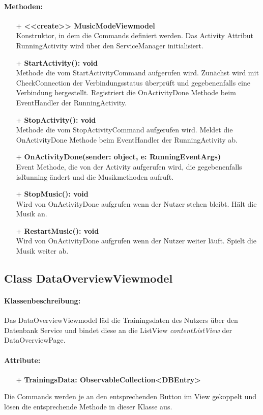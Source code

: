 \documentclass[a4paper,12pt]{article}
\begin{document}
\paragraph{Methoden:}
\begin{itemize}
	\item[+] \textbf{<<create>> MusicModeViewmodel} \\ Konstruktor, in dem die Commands definiert werden. Das Activity Attribut RunningActivity wird über den ServiceManager initialisiert.
	\item[+] \textbf{StartActivity(): void} \\ Methode die vom StartActivityCommand aufgerufen wird. Zunächst wird mit CheckConnection der Verbindungsstatus überprüft und gegebenenfalls eine Verbindung hergestellt. Registriert die OnActivityDone Methode beim EventHandler der RunningActivity. 
	\item[+] \textbf{StopActivity(): void} \\ Methode die vom StopActivityCommand aufgerufen wird. Meldet die OnActivityDone Methode beim EventHandler der RunningActivity ab. 
	\item[+] \textbf{OnActivityDone(sender: object, e: RunningEventArgs)} \\ Event Methode, die von der Activity aufgerufen wird, die gegebenenfalls isRunning ändert und die Musikmethoden aufruft.
	\item[+] \textbf{StopMusic(): void} \\ Wird von OnActivityDone aufgrufen wenn der Nutzer stehen bleibt. Hält die Musik an.
	\item[+] \textbf{RestartMusic(): void} \\ Wird von OnActivityDone aufgrufen wenn der Nutzer weiter läuft. Spielt die Musik weiter ab.
\end{itemize}

\subsection{Class DataOverviewViewmodel}
\paragraph{Klassenbeschreibung:}
Das DataOverviewViewmodel läd die Trainingsdaten des Nutzers über den Datenbank Service und bindet diese an die ListView \textit{contentListView} der DataOverviewPage.
\paragraph{Attribute:}
\begin{itemize}
	\item[+] \textbf{TrainingsData: ObservableCollection<DBEntry>}
\end{itemize}
Die Commands werden je an den entsprechenden Button im View gekoppelt und lösen die entsprechende Methode in dieser Klasse aus.
\end{document}
